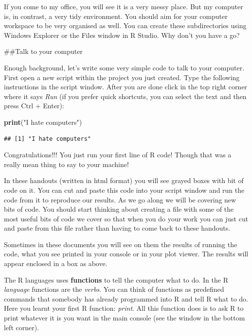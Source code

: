 \documentclass[]{book}
\newenvironment{Shaded}{\begin{snugshade}}{\end{snugshade}}
\newcommand{\KeywordTok}[1]{\textcolor[rgb]{0.13,0.29,0.53}{\textbf{#1}}}
\newcommand{\NormalTok}[1]{#1}
\newcommand{\StringTok}[1]{\textcolor[rgb]{0.31,0.60,0.02}{#1}}
\theoremstyle{definition}
\theoremstyle{definition}
\theoremstyle{definition}
\theoremstyle{remark}
\begin{document}
If you come to my office, you will see it is a very messy place. But my
computer is, in contrast, a very tidy environment. You should aim for
your computer workspace to be very organised as well. You can create
these subdirectories using Windows Explorer or the Files window in R
Studio. Why don't you have a go?

\#\#Talk to your computer

Enough background, let's write some very simple code to talk to your
computer. First open a new script within the project you just created.
Type the following instructions in the script window. After you are done
click in the top right corner where it says \emph{Run} (if you prefer
quick shortcuts, you can select the text and then press Ctrl + Enter):

\begin{Shaded}
\begin{Highlighting}[]
\KeywordTok{print}\NormalTok{(}\StringTok{"I hate computers"}\NormalTok{)}
\end{Highlighting}
\end{Shaded}

\begin{verbatim}
## [1] "I hate computers"
\end{verbatim}

Congratulations!!! You just run your first line of R code! Though that
was a really mean thing to say to your machine!

In these handouts (written in html format) you will see grayed boxes
with bit of code on it. You can cut and paste this code into your script
window and run the code from it to reproduce our results. As we go along
we will be covering new bits of code. You should start thinking about
creating a file with some of the most useful bits of code we cover so
that when you do your work you can just cut and paste from this file
rather than having to come back to these handouts.

Sometimes in these documents you will see on them the results of running
the code, what you see printed in your console or in your plot viewer.
The results will appear enclosed in a box as above.

The R languages uses \textbf{functions} to tell the computer what to do.
In the R \emph{language} functions are the \emph{verbs}. You can think
of functions as predefined commands that somebody has already programmed
into R and tell R what to do. Here you learnt your first R function:
\emph{print}. All this function does is to ask R to print whatever it is
you want in the main console (see the window in the bottom left corner).
\end{document}
